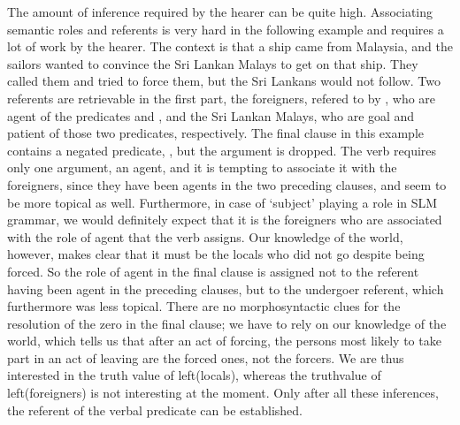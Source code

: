The amount of inference required by the hearer can be quite high. Associating semantic roles and referents is very hard in the following example and requires a lot of work by the hearer. The context is that a ship came from Malaysia, and the sailors wanted to convince the Sri Lankan Malays to get on that ship. They called them and tried to force them, but the Sri Lankans would not follow. Two referents are retrievable in the first part, the foreigners, refered to by , who are agent of the predicates  and , and the Sri Lankan Malays, who are goal and patient of those two predicates, respectively. The final clause in this example contains a negated predicate, , but the argument is dropped. The verb  requires only one argument, an agent, and it is tempting to associate it with the foreigners, since they have been agents in the two preceding clauses, and seem to be more topical as well. Furthermore, in case of `subject' playing a role in SLM grammar, we would definitely expect that it is the foreigners who are associated with the role of agent that the verb  assigns. Our knowledge of the world, however, makes clear that it must be the locals who did not go despite being forced. So the role of agent in the final clause is assigned not to the referent having been agent in the preceding clauses, but to the undergoer referent, which furthermore was less topical. There are no morphosyntactic clues for the resolution of the zero in the final clause; we have to rely on our knowledge of the world, which tells us that after an act of forcing, the persons most likely to take part in an  act of leaving are the forced ones, not the forcers. We are thus interested in the truth value of left(locals), whereas the truthvalue of left(foreigners) is not interesting at the moment. Only after all these inferences, the referent of the verbal predicate  can be established.

\\



